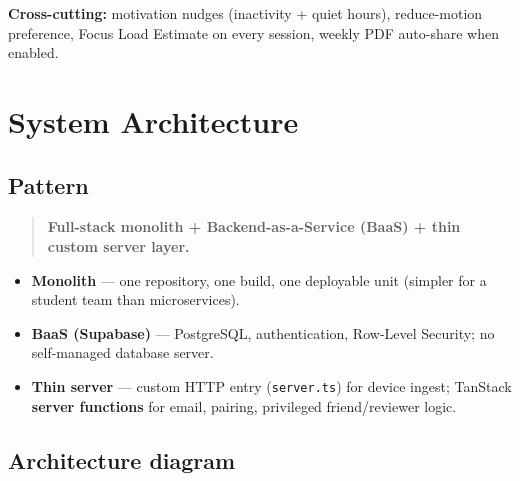 \documentclass[11pt,a4paper]{article}
\newcommand{\filepath}[1]{\texttt{#1}}
\begin{document}
\textbf{Cross-cutting:} motivation nudges (inactivity + quiet hours), reduce-motion preference,
Focus Load Estimate on every session, weekly PDF auto-share when enabled.

\section{System Architecture}

\subsection{Pattern}

\begin{quote}
\textbf{Full-stack monolith + Backend-as-a-Service (BaaS) + thin custom server layer.}
\end{quote}

\begin{itemize}[leftmargin=*]
  \item \textbf{Monolith} --- one repository, one build, one deployable unit (simpler for a student team than microservices).
  \item \textbf{BaaS (Supabase)} --- PostgreSQL, authentication, Row-Level Security; no self-managed database server.
  \item \textbf{Thin server} --- custom HTTP entry (\filepath{server.ts}) for device ingest; TanStack \textbf{server functions} for email, pairing, privileged friend/reviewer logic.
\end{itemize}

\subsection{Architecture diagram}
\end{document}
